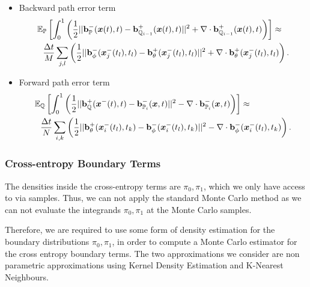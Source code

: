\documentclass[a4paper,12pt,twoside,openright]{report}
\theoremstyle{definition}
\begin{document}
\begin{itemize}
    \item Backward path error term 
\begin{align}
    \mathbb{E}&_{{\mathbb{P}}}\left[\int_0^1 \left(\frac{1}{2}||{\mathbf{b}}_{\mathbb{P}}^{-}({\bm{x}}(t),t) - {\mathbf{b}}_{{\mathbb{Q}}_{i-1}}^{+}({\bm{x}}(t),t)||^2 + \nabla\cdot{\mathbf{b}}^{+}_{{\mathbb{Q}}_{i-1}}({\bm{x}}(t),t) \right)\right] \approx \nonumber   \\
    &\frac{\Delta t}{M} \sum_{j,l}\left(\frac{1}{2}||{\mathbf{b}}_\phi^{-}({\bm{x}}^{-}_j(t_l), t_l) - {\mathbf{b}}_{\theta}^{+}({\bm{x}}^{-}_j(t_l), t_l)||^2 + \nabla\cdot{\mathbf{b}}^{+}_{\theta}({\bm{x}}^{-}_j(t_l), t_l)\right).
\end{align}
    \item Forward path error term
\begin{align}
    \mathbb{E}&_{{\mathbb{Q}}}\left[\int_0^1 \left(\frac{1}{2}||{\mathbf{b}}_{\mathbb{Q}}^{+}({\bm{x}}^{-}(t), t) - {\mathbf{b}}_{{\mathbb{P}}_{i}}^{-}({\bm{x}}, t)||^2 - \nabla\cdot{\mathbf{b}}^{-}_{{\mathbb{P}}_{i}}({\bm{x}}, t) \right)\right]  \approx \nonumber   \\
    &\frac{\Delta t}{N} \sum_{i,k}\left(\frac{1}{2}||{\mathbf{b}}_\theta^{+}({\bm{x}}^{-}_i(t_l), t_k) - {\mathbf{b}}_{\phi}^{-}({\bm{x}}^{-}_i(t_l), t_k)||^2 - \nabla\cdot{\mathbf{b}}^{-}_{\phi}({\bm{x}}^{-}_i(t_l), t_k)\right).
\end{align}
\end{itemize}
\subsubsection{Cross-entropy Boundary Terms}

The densities inside the cross-entropy terms are $\pi_0, \pi_1$, which we only have access to via samples. Thus, we can not apply the standard Monte Carlo  method as we can not evaluate the integrands $\pi_0, \pi_1$ at the Monte Carlo samples.

Therefore, we are required to use some form of density estimation for the boundary distributions $\pi_0, \pi_1$, in order to compute a Monte Carlo  estimator for the cross entropy boundary terms. The two approximations we consider are non parametric approximations using Kernel Density Estimation and K-Nearest Neighbours.
\end{document}

